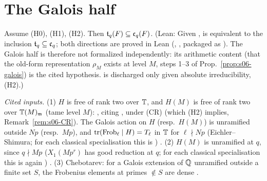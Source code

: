 \section{The Galois half}

\begin{proposition}\label{prop:s06-galois}
Assume (H0), (H1), (H2). Then $\mathfrak{t}_q(F)\subseteq\mathfrak{c}_q(F)$. \stpmc{}
(Lean: Given ,  is equivalent to the inclusion $\mathfrak{t}_q\subseteq\mathfrak{c}_q$; both directions are proved in Lean (, , packaged as ). The Galois half is therefore not formalized independently: its arithmetic content (that the old-form representation $\rho_M$ exists at level $M$, steps 1--3 of Prop.~\ref{prop:s06-galois}) is the cited hypothesis.  is discharged only given absolute irreducibility, (H2).)
\end{proposition}
\noindent\emph{Cited inputs.}
(1) $H$ is free of rank two over $\mathbb{T}$, and $H(M)$ is free of rank two over $\mathbb{T}(M)_{\mathfrak{m}}$ (tame level $M$):
\cite[\S7.2, p.~68]{Hs} 
\stcited, citing \cite[Cor.~1, 2, p.~482]{Wi95}
, under (CR) (which (H2)
implies, Remark~\ref{rem:s06-CR}). The Galois action on $H$ (resp.\ $H(M)$) is unramified outside $Np$ (resp.\ $Mp$), and
$\operatorname{tr}(\mathrm{Frob}_\ell\mid H)=T_\ell$ in $\mathbb{T}$ for $\ell\nmid Np$ (Eichler--Shimura; for each classical specialisation this is
) \stcited.
(2) $H(M)$ is unramified at $q$, since $q\nmid Mp$ ($X_1(Mp^r)$ has good reduction at $q$; for each classical specialisation this is
again ) \stknown.
(3) Chebotarev: for a Galois extension of $\mathbb{Q}$ unramified outside a finite set $S$, the Frobenius elements at primes $\notin S$ are
dense  \stknown.


